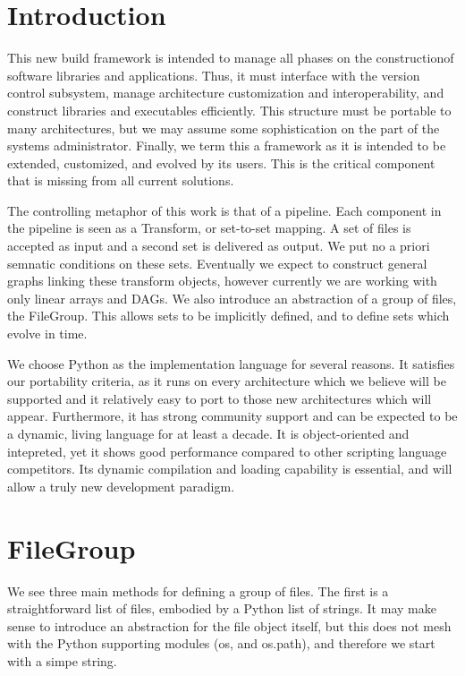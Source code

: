 \section{Introduction}

This new build framework is intended to manage all phases on the constructionof software libraries and
applications. Thus, it must interface with the version control subsystem, manage architecture customization and
interoperability, and construct libraries and executables efficiently. This structure must be portable to many
architectures, but we may assume some sophistication on the part of the systems administrator. Finally, we term this a
framework as it is intended to be extended, customized, and evolved by its users. This is the critical component that is
missing from all current solutions.

The controlling metaphor of this work is that of a pipeline. Each component in the pipeline is seen as a Transform, or
set-to-set mapping. A set of files is accepted as input and a second set is delivered as output. We put no a priori
semnatic conditions on these sets. Eventually we expect to construct general graphs linking these transform objects,
however currently we are working with only linear arrays and DAGs. We also introduce an abstraction of a group of files,
the FileGroup. This allows sets to be implicitly defined, and to define sets which evolve in time.

We choose Python as the implementation language for several reasons. It satisfies our portability criteria, as it runs
on every architecture which we believe will be supported and it relatively easy to port to those new architectures which
will appear. Furthermore, it has strong community support and can be expected to be a dynamic, living language for at
least a decade. It is object-oriented and intepreted, yet it shows good performance compared to other scripting language
competitors. Its dynamic compilation and loading capability is essential, and will allow a truly new development paradigm.

\section{FileGroup}

We see three main methods for defining a group of files. The first is a straightforward list of files, embodied by a
Python list of strings. It may make sense to introduce an abstraction for the file object itself, but this does not mesh
with the Python supporting modules (os, and os.path), and therefore we start with a simpe string.

